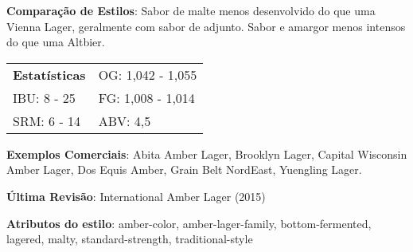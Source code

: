 \textbf{Comparação de Estilos}: Sabor de malte menos desenvolvido do que uma Vienna Lager, geralmente com sabor de adjunto. Sabor e amargor menos intensos do que uma Altbier.

\begin{tabular}{@{}p{35mm}p{35mm}@{}}
  \textbf{Estatísticas} & OG: 1,042 - 1,055 \\
  IBU: 8 - 25 & FG: 1,008 - 1,014 \\
  SRM: 6 - 14 & ABV: 4,5%
\end{tabular}

\textbf{Exemplos Comerciais}: Abita Amber Lager, Brooklyn Lager, Capital Wisconsin Amber Lager, Dos Equis Amber, Grain Belt NordEast, Yuengling Lager.

\textbf{Última Revisão}: International Amber Lager (2015)

\textbf{Atributos do estilo}: amber-color, amber-lager-family, bottom-fermented, lagered, malty, standard-strength, traditional-style